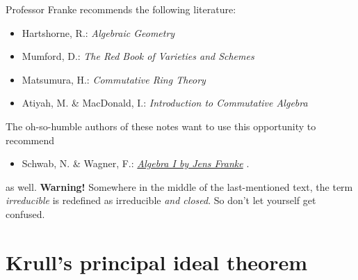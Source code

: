 \documentclass[a4paper,parskip=half,numbers=enddot, DIV=12]{scrreprt}
\begin{document}
Professor Franke recommends the following literature:
\begin{itemize}
	\item Hartshorne, R.: \emph{Algebraic Geometry}
	\item Mumford, D.: \emph{The Red Book of Varieties and Schemes}
	\item Matsumura, H.: \emph{Commutative Ring Theory}
	\item Atiyah, M. \& MacDonald, I.: \emph{Introduction to Commutative Algebra} \cite{matsumuraCRT}
\end{itemize}
The oh-so-humble authors of these notes want to use this opportunity to recommend
\begin{itemize}
	\item Schwab, N. \& Wagner, F.:  \href{https://github.com/Nicholas42/AlgebraFranke/tree/master/AlgebraI}{\emph{Algebra I by Jens Franke}} \cite{alg1}.
\end{itemize}
as well. \textbf{Warning!} Somewhere in the middle of the last-mentioned text, the term \emph{irreducible} is redefined as irreducible \emph{and closed}. So don't let yourself get confused. 

\chapter{Krull's principal ideal theorem}
\end{document}
